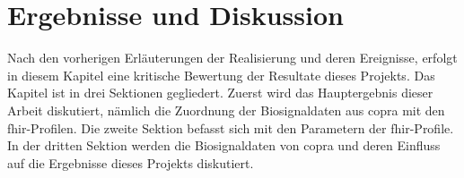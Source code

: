 \chapter{Ergebnisse und Diskussion} \label{ch:discussion}

 Nach den vorherigen Erläuterungen der Realisierung und deren Ereignisse, erfolgt in diesem Kapitel eine kritische Bewertung der Resultate dieses Projekts. Das Kapitel ist in drei Sektionen gegliedert. Zuerst wird das Hauptergebnis dieser Arbeit diskutiert, nämlich die Zuordnung der Biosignaldaten aus \ac{copra} mit den \ac{fhir}-Profilen. Die zweite Sektion befasst sich mit den Parametern der \ac{fhir}-Profile. In der dritten Sektion werden die Biosignaldaten von \ac{copra} und deren Einfluss auf die Ergebnisse dieses Projekts diskutiert.